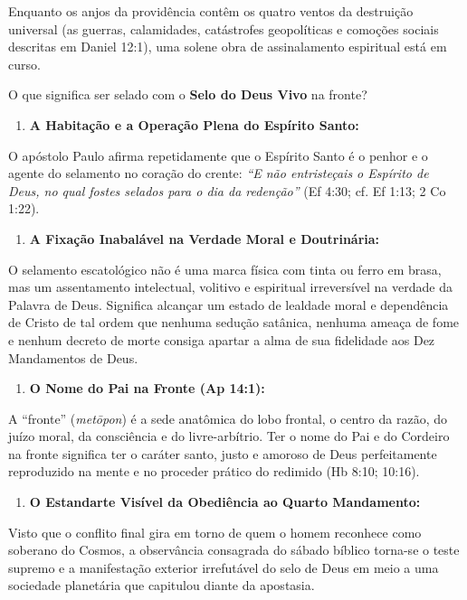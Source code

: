 \documentclass[11pt,a4paper,openany]{book}
\begin{document}
Enquanto os anjos da providência contêm os quatro ventos da destruição universal (as guerras, calamidades, catástrofes geopolíticas e comoções sociais descritas em Daniel 12:1), uma solene obra de assinalamento espiritual está em curso.

O que significa ser selado com o \textbf{Selo do Deus Vivo} na fronte?

\begin{enumerate}
  \item \textbf{A Habitação e a Operação Plena do Espírito Santo:}
\end{enumerate}

O apóstolo Paulo afirma repetidamente que o Espírito Santo é o penhor e o agente do selamento no coração do crente: \textit{``E não entristeçais o Espírito de Deus, no qual fostes selados para o dia da redenção''} (Ef 4:30; cf. Ef 1:13; 2 Co 1:22).
\begin{enumerate}
  \item \textbf{A Fixação Inabalável na Verdade Moral e Doutrinária:}
\end{enumerate}

O selamento escatológico não é uma marca física com tinta ou ferro em brasa, mas um assentamento intelectual, volitivo e espiritual irreversível na verdade da Palavra de Deus. Significa alcançar um estado de lealdade moral e dependência de Cristo de tal ordem que nenhuma sedução satânica, nenhuma ameaça de fome e nenhum decreto de morte consiga apartar a alma de sua fidelidade aos Dez Mandamentos de Deus.
\begin{enumerate}
  \item \textbf{O Nome do Pai na Fronte (Ap 14:1):}
\end{enumerate}

A ``fronte'' (\textit{metōpon}) é a sede anatômica do lobo frontal, o centro da razão, do juízo moral, da consciência e do livre-arbítrio. Ter o nome do Pai e do Cordeiro na fronte significa ter o caráter santo, justo e amoroso de Deus perfeitamente reproduzido na mente e no proceder prático do redimido (Hb 8:10; 10:16).
\begin{enumerate}
  \item \textbf{O Estandarte Visível da Obediência ao Quarto Mandamento:}
\end{enumerate}

Visto que o conflito final gira em torno de quem o homem reconhece como soberano do Cosmos, a observância consagrada do sábado bíblico torna-se o teste supremo e a manifestação exterior irrefutável do selo de Deus em meio a uma sociedade planetária que capitulou diante da apostasia.
\end{document}
